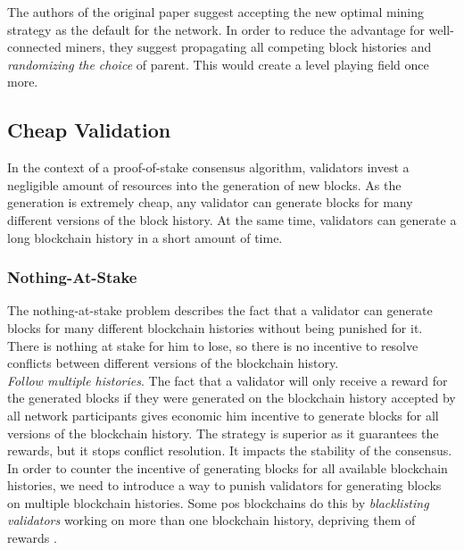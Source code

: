 \documentclass[12pt,a4paper]{article}
\begin{document}
The authors of the original paper suggest accepting the new optimal mining strategy as the default for the network. In order to reduce the advantage for well-connected miners, they suggest propagating all competing block histories and \textit{randomizing the choice} of parent. This would create a level playing field once more.\\

\subsection{Cheap Validation}

In the context of a proof-of-stake consensus algorithm, \glspl{validator} invest a negligible amount of resources into the generation of new \glspl{block}. As the generation is extremely cheap, any \gls{validator} can generate \glspl{block} for many different versions of the block history. At the same time, \glspl{validator} can generate a long blockchain history in a short amount of time.\\

\subsubsection{Nothing-At-Stake}

The nothing-at-stake problem describes the fact that a \gls{validator} can generate \glspl{block} for many different blockchain histories without being punished for it. There is nothing at stake for him to lose, so there is no incentive to resolve conflicts between different versions of the blockchain history.\\

\textit{Follow multiple histories}. The fact that a \gls{validator} will only receive a \gls{reward} for the generated \glspl{block} if they were generated on the blockchain history accepted by all network participants gives economic him incentive to generate blocks for all versions of the blockchain history. The strategy is superior as it guarantees the \glspl{reward}, but it stops conflict resolution. It impacts the stability of the \gls{consensus}.\\

In order to counter the incentive of generating \glspl{block} for all available blockchain histories, we need to introduce a way to punish \glspl{validator} for generating blocks on multiple blockchain histories. Some \acrshort{pos} \glspl{blockchain} do this by \textit{blacklisting \glspl{validator}} working on more than one blockchain history, depriving them of \glspl{reward} \cite{secure}.\\
\end{document}
